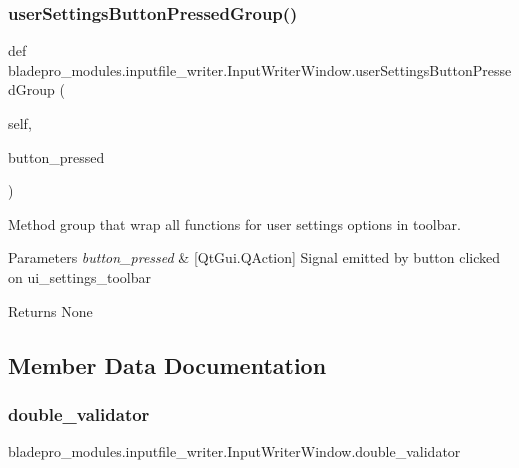 \subsubsection{\texorpdfstring{user\+Settings\+Button\+Pressed\+Group()}{userSettingsButtonPressedGroup()}}
{\footnotesize\ttfamily def bladepro\+\_\+modules.\+inputfile\+\_\+writer.\+Input\+Writer\+Window.\+user\+Settings\+Button\+Pressed\+Group (\begin{DoxyParamCaption}\item[{}]{self,  }\item[{}]{button\+\_\+pressed }\end{DoxyParamCaption})}



Method group that wrap all functions for user settings options in toolbar. 


\begin{DoxyParams}{Parameters}
{\em button\+\_\+pressed} & \mbox{[}Qt\+Gui.\+Q\+Action\mbox{]} Signal emitted by button clicked on ui\+\_\+settings\+\_\+toolbar \\
\hline
\end{DoxyParams}
\begin{DoxyReturn}{Returns}
None 
\end{DoxyReturn}


\subsection{Member Data Documentation}
\hypertarget{classbladepro__modules_1_1inputfile__writer_1_1_input_writer_window_a007df19a104366a8bb63a8ed11e0e5e4}{}\label{classbladepro__modules_1_1inputfile__writer_1_1_input_writer_window_a007df19a104366a8bb63a8ed11e0e5e4} 
\subsubsection{\texorpdfstring{double\+\_\+validator}{double\_validator}}
{\footnotesize\ttfamily bladepro\+\_\+modules.\+inputfile\+\_\+writer.\+Input\+Writer\+Window.\+double\+\_\+validator}

\hypertarget{classbladepro__modules_1_1inputfile__writer_1_1_input_writer_window_a17d54af05f4344118b082c2384a88bec}{}\label{classbladepro__modules_1_1inputfile__writer_1_1_input_writer_window_a17d54af05f4344118b082c2384a88bec} 
